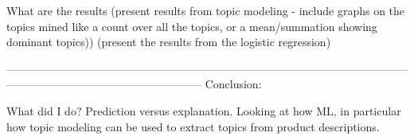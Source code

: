 What are the results 
(present results from topic modeling - include graphs on the topics mined like a count over all the topics, or a mean/summation showing dominant topics))
(present the results from the logistic regression)



-----------------------------------------------------------------------------------------------------------------------------------------------------------------
Conclusion:

What did I do? Prediction versus explanation. Looking at how ML, in particular how topic modeling can be used to extract topics from product descriptions. 













